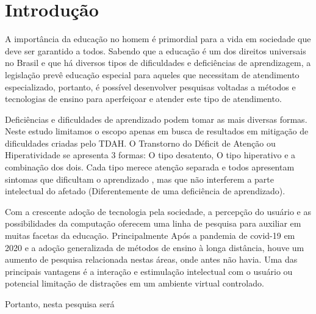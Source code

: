 
\chapter{Introdução}

A importância da educação no homem é primordial para a vida em sociedade que deve ser garantido a todos. Sabendo que a educação é um dos direitos universais no Brasil e que há diversos tipos de dificuldades e deficiências de aprendizagem, a legislação prevê educação especial para aqueles que necessitam de atendimento especializado, portanto, é possível desenvolver  pesquisas voltadas a métodos e tecnologias de ensino para aperfeiçoar e atender este tipo de atendimento.

Deficiências e dificuldades de aprendizado podem tomar as mais diversas formas. Neste estudo limitamos o escopo apenas em busca de resultados em mitigação de dificuldades criadas pelo TDAH. O Transtorno do Déficit de Atenção ou Hiperatividade se apresenta 3 formas: O tipo desatento, O tipo hiperativo e a combinação dos dois. Cada tipo merece atenção separada e todos apresentam sintomas que dificultam o aprendizado \cite{okuyama}, mas que  não interferem a parte intelectual do afetado (Diferentemente de uma deficiência de aprendizado). 

Com a crescente adoção de tecnologia pela sociedade, a percepção do usuário e as possibilidades da computação oferecem uma linha de pesquisa para auxiliar em muitas facetas da educação. Principalmente Após a pandemia de covid-19 em 2020 e a adoção generalizada de métodos de ensino à longa distância, houve um aumento de pesquisa relacionada nestas áreas, onde antes não havia. Uma das principais vantagens é a interação e estimulação intelectual com o usuário ou potencial limitação de distrações em um ambiente virtual controlado. 

Portanto, nesta pesquisa será 

